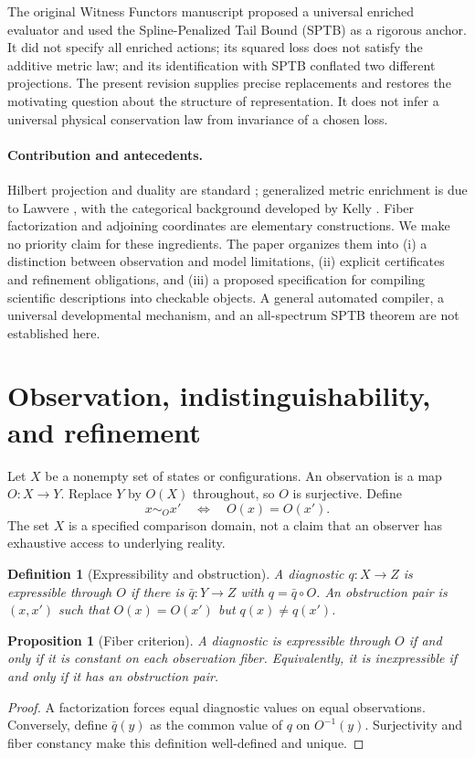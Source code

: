 \documentclass[11pt,letterpaper]{article}
\newtheorem{proposition}[theorem]{Proposition}
\newtheorem{definition}[theorem]{Definition}
\begin{document}
The original Witness Functors manuscript \cite{witnessoriginal} proposed a universal enriched evaluator and used the Spline-Penalized Tail Bound (SPTB) as a rigorous anchor. It did not specify all enriched actions; its squared loss does not satisfy the additive metric law; and its identification with SPTB conflated two different projections. The present revision supplies precise replacements and restores the motivating question about the structure of representation. It does not infer a universal physical conservation law from invariance of a chosen loss.

\paragraph{Contribution and antecedents.}
Hilbert projection and duality are standard \cite{rudin}; generalized metric enrichment is due to Lawvere \cite{lawvere}, with the categorical background developed by Kelly \cite{kelly}. Fiber factorization and adjoining coordinates are elementary constructions. We make no priority claim for these ingredients. The paper organizes them into (i) a distinction between observation and model limitations, (ii) explicit certificates and refinement obligations, and (iii) a proposed specification for compiling scientific descriptions into checkable objects. A general automated compiler, a universal developmental mechanism, and an all-spectrum SPTB theorem are not established here.

\section{Observation, indistinguishability, and refinement}\label{sec:observation}
Let $X$ be a nonempty set of states or configurations. An observation is a map
$O:X\to Y$. Replace $Y$ by $O(X)$ throughout, so $O$ is surjective. Define
\[
x\sim_O x' \quad\Longleftrightarrow\quad O(x)=O(x').
\]
The set $X$ is a specified comparison domain, not a claim that an observer has exhaustive access to underlying reality.

\begin{definition}[Expressibility and obstruction]
A diagnostic $q:X\to Z$ is \emph{expressible through $O$} if there is
$\bar q:Y\to Z$ with $q=\bar q\circ O$. An \emph{obstruction pair} is
$(x,x')$ such that $O(x)=O(x')$ but $q(x)\ne q(x')$.
\end{definition}

\begin{proposition}[Fiber criterion]\label{prop:fibers}
A diagnostic is expressible through $O$ if and only if it is constant on each observation fiber. Equivalently, it is inexpressible if and only if it has an obstruction pair.
\end{proposition}
\begin{proof}
A factorization forces equal diagnostic values on equal observations.
Conversely, define $\bar q(y)$ as the common value of $q$ on $O^{-1}(y)$.
Surjectivity and fiber constancy make this definition well-defined and unique.
\end{proof}
\end{document}
